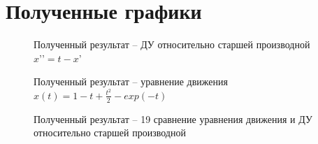 \documentclass[12pt]{article}
\begin{document}
	\newpage 
	\clearpage
	\section{Полученные графики}
	\begin{figure}[h]
		\caption{Полученный результат -- ДУ относительно старшей производной $x’’=t-x’$}
	\end{figure}

	\begin{figure}[h]
		\caption{Полученный результат --  уравнение движения $x(t)=1-t+\frac{t^{2}}{2}-exp(-t)$}
	\end{figure}

	\begin{figure}[h]
	\caption{Полученный результат --  19 сравнение уравнения движения и ДУ относительно старшей производной}
\end{figure}
\end{document}
